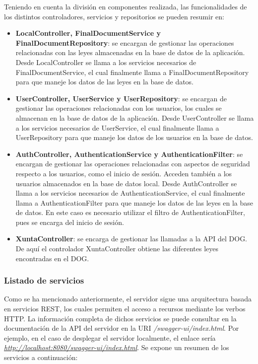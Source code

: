 Teniendo en cuenta la división en componentes realizada, las funcionalidades de los distintos controladores, servicios y repositorios se pueden resumir en:
\begin{itemize}
    \item {\bf LocalController, FinalDocumentService y FinalDocumentRepository}: se encargan de gestionar las operaciones relacionadas con las leyes almacenadas en la base de datos de la aplicación. Desde LocalController se llama a los servicios necesarios de FinalDocumentService, el cual finalmente llama a FinalDocumentRepository para que maneje los datos de las leyes en la base de datos.
    \item {\bf UserController, UserService y UserRepository}: se encargan de gestionar las operaciones relacionadas con los usuarios, los cuales se almacenan en la base de datos de la aplicación. Desde UserController se llama a los servicios necesarios de UserService, el cual finalmente llama a UserRepository para que maneje los datos de los usuarios en la base de datos.
    \item {\bf AuthController, AuthenticationService y AuthenticationFilter}: se encargan de gestionar las operaciones relacionadas con aspectos de seguridad respecto a los usuarios, como el inicio de sesión. Acceden también a los usuarios almacenados en la base de datos local. Desde AuthController se llama a los servicios necesarios de AuthenticationService, el cual finalmente llama a AuthenticationFilter para que maneje los datos de las leyes en la base de datos. En este caso es necesario utilizar el filtro de AuthenticationFilter, pues se encarga del inicio de sesión.
    \item {\bf XuntaController}: se encarga de gestionar las llamadas a la API del DOG. De aquí el controlador XuntaController obtiene las diferentes leyes encontradas en el DOG.
\end{itemize}

\subsubsection{Listado de servicios}

Como se ha mencionado anteriormente, el servidor sigue una arquitectura basada en servicios REST, los cuales permiten el acceso a recursos mediante los verbos HTTP. La información completa de dichos servicios se puede consultar en la documentación de la API del servidor en la URI {\it /swagger-ui/index.html}. Por ejemplo, en el caso de desplegar el servidor localmente, el enlace sería {\it \url{http://localhost:8080/swagger-ui/index.html}}. Se expone un resumen de los servicios a continuación:

